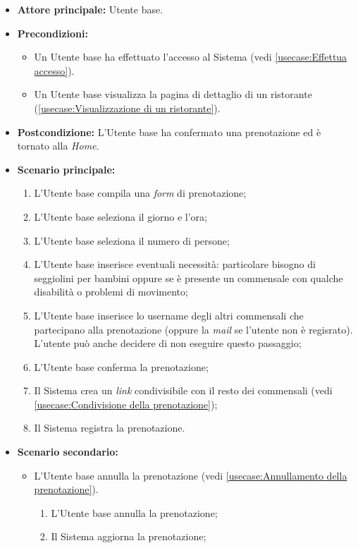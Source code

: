 \label{usecase:Prenotazione di un tavolo}
\begin{itemize}
	\item \textbf{Attore principale:} Utente base.
	\item \textbf{Precondizioni:}
	      \begin{itemize}
		      \item Un Utente base ha effettuato l'accesso al Sistema (vedi \autoref{usecase:Effettua accesso}).
		      \item Un Utente base visualizza la pagina di dettaglio di un ristorante (\autoref{usecase:Visualizzazione di un ristorante}).
	      \end{itemize}
	\item \textbf{Postcondizione:} L'Utente base ha confermato una prenotazione ed è tornato alla \textit{Home}.


	\item \textbf{Scenario principale:}
	      \begin{enumerate}
		      \item L'Utente base compila una \textit{form} di prenotazione;
		      \item L'Utente base seleziona il giorno e l'ora;
		      \item L'Utente base seleziona il numero di persone;
		      \item L'Utente base inserisce eventuali necessità: particolare bisogno di seggiolini per bambini oppure se è presente un commensale con qualche disabilità o problemi di movimento;
		      \item L'Utente base inserisce lo username degli altri commensali che partecipano alla prenotazione (oppure la \textit{mail} se l'utente non è regisrato).
		            L'utente può anche decidere di non eseguire questo passaggio;
		      \item L'Utente base conferma la prenotazione;
		      \item Il Sistema crea un \textit{link} condivisibile con il resto dei commensali (vedi \autoref{usecase:Condivisione della prenotazione});
		      \item Il Sistema registra la prenotazione.

	      \end{enumerate}

	\item \textbf{Scenario secondario:}
	      \begin{itemize}
		      \item L'Utente base annulla la prenotazione (vedi
		            \autoref{usecase:Annullamento della prenotazione}).
		            \begin{enumerate}
			            \item L'Utente base annulla la prenotazione;
			            \item Il Sistema aggiorna la prenotazione;
		            \end{enumerate}
	      \end{itemize}
\end{itemize}

